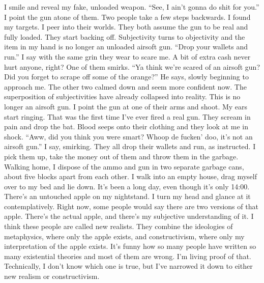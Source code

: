 \documentclass[a4paper, 12pt]{book}
\begin{document}
\newline
\tab
I smile and reveal my fake, unloaded weapon. ``See, I ain’t gonna do shit for you.'' I point the gun atone of them. Two people take a few steps backwards. I found my targets. I peer into their worlds. They both assume the gun to be real and fully loaded. They start backing off. Subjectivity turns to objectivity and the item in my hand is no longer an unloaded airsoft gun. ``Drop your wallets and run.'' I say with the same grin they wear to scare me. A bit of extra cash never hurt anyone, right?
\newline
\tab
One of them smirks. ``Ya think we’re scared of an airsoft gun? Did you forget to scrape off some of the orange?'' He says, slowly beginning to approach me. The other two calmed down and seem more confident now. The superposition of subjectivities have already collapsed into reality. This is no longer an airsoft gun. I point the gun at one of their arms and shoot. My ears start ringing. That was the first time I’ve ever fired a real gun.
\newline
\tab
They scream in pain and drop the bat. Blood seeps onto their clothing and they look at me in shock. ``Aww, did you think you were smart? Whoop de fucken’ doo, it’s not an airsoft gun.'' I say, smirking. They all drop their wallets and run, as instructed. I pick them up, take the money out of them and throw them in the garbage. Walking home, I dispose of the ammo and gun in two separate garbage cans, about five blocks apart from each other.
\newline
\tab
I walk into an empty house, drag myself over to my bed and lie down. It’s been a long day, even though it’s only 14:00. There’s an untouched apple on my nightstand. I turn my head and glance at it contemplatively. Right now, some people would say there are two versions of that apple. There’s the actual apple, and there’s my subjective understanding of it. I think these people are called new realists. They combine the ideologies of metaphysics, where only the apple exists, and constructivism, where only my interpretation of the apple exists. It’s funny how so many people have written so many existential theories and most of them are wrong. I’m living proof of that. Technically, I don’t know which one is true, but I’ve narrowed it down to either new realism or constructivism.
\newline
\tab
\end{document}
